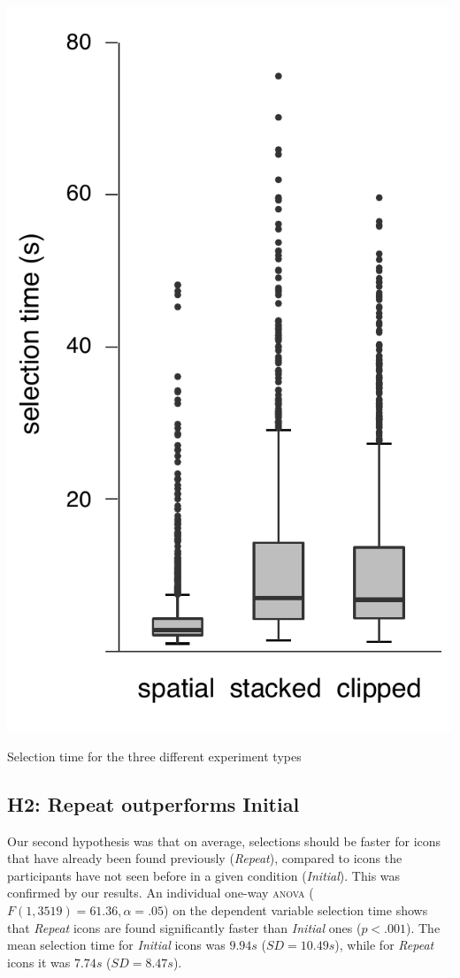 \documentclass{tufte-book} %
\begin{document}
\begin{marginfigure}
  \includegraphics[width=\linewidth]{duration-types.pdf}
  \caption{Selection time for the three different experiment types}
  \label{fig:duration-types}
\end{marginfigure}

\subsection{H2: Repeat outperforms Initial}
Our second hypothesis was that on average, selections should be faster for icons that have already been found previously (\emph{Repeat}), compared to icons the participants have not seen before in a given condition (\emph{Initial}). This was confirmed by our results. An individual one-way \textsc{anova} ($F(1,3519) = 61.36, \alpha = .05$) on the dependent variable selection time shows that \emph{Repeat} icons are found significantly faster than \emph{Initial} ones ($p < .001$). The mean selection time for \emph{Initial} icons was $9.94 s$ ($SD = 10.49 s$), while for \emph{Repeat} icons it was $7.74 s$ ($SD = 8.47 s$).
\end{document}
